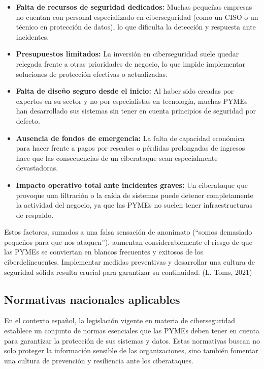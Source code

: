 \documentclass[a4paper, 10pt]{article}
\begin{document}
\begin{itemize}
  \item \textbf{Falta de recursos de seguridad dedicados:} Muchas pequeñas empresas no cuentan con personal especializado en ciberseguridad (como un CISO o un técnico en protección de datos), lo que dificulta la detección y respuesta ante incidentes.
  \item \textbf{Presupuestos limitados:} La inversión en ciberseguridad suele quedar relegada frente a otras prioridades de negocio, lo que impide implementar soluciones de protección efectivas o actualizadas.
  \item \textbf{Falta de diseño seguro desde el inicio:} Al haber sido creadas por expertos en su sector y no por especialistas en tecnología, muchas PYMEs han desarrollado sus sistemas sin tener en cuenta principios de seguridad por defecto.
  \item \textbf{Ausencia de fondos de emergencia:} La falta de capacidad económica para hacer frente a pagos por rescates o pérdidas prolongadas de ingresos hace que las consecuencias de un ciberataque sean especialmente devastadoras.
  \item \textbf{Impacto operativo total ante incidentes graves:} Un ciberataque que provoque una filtración o la caída de sistemas puede detener completamente la actividad del negocio, ya que las PYMEs no suelen tener infraestructuras de respaldo.
\end{itemize}

\par\vspace{0.5cm}
Estos factores, sumados a una falsa sensación de anonimato (“somos demasiado pequeños para que nos ataquen”), aumentan considerablemente el riesgo de que las PYMEs se conviertan en blancos frecuentes y exitosos de los ciberdelincuentes. Implementar medidas preventivas y desarrollar una cultura de seguridad sólida resulta crucial para garantizar su continuidad. (L. Toms, 2021) \cite{toms2021}



\subsection{Normativas nacionales aplicables}

    En el contexto español, la legislación vigente en materia de ciberseguridad establece un conjunto de normas esenciales que las PYMEs deben tener en cuenta para garantizar la protección de sus sistemas y datos. Estas normativas buscan no solo proteger la información sensible de las organizaciones, sino también fomentar una cultura de prevención y resiliencia ante los ciberataques.
    \par\vspace{0.5cm}
\end{document}
